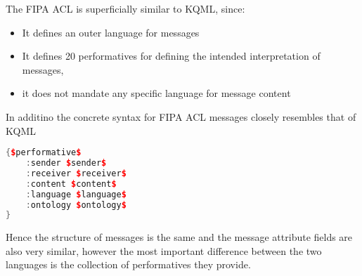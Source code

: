 The FIPA ACL is superficially similar to KQML, since:
\begin{itemize}
\item It defines an outer language for messages
\item It defines 20 performatives for defining the intended interpretation of messages,
\item it does not mandate any specific language for message content
\end{itemize}
In additino the concrete syntax for FIPA ACL messages closely resembles that of KQML

\begin{lstlisting}[language=C++]
{$performative$
	:sender $sender$
	:receiver $receiver$
	:content $content$
	:language $language$
	:ontology $ontology$
}
\end{lstlisting}
Hence the structure of messages is the same and the message attribute fields are also very similar, however the most important difference between the two languages is the collection of performatives they provide.


